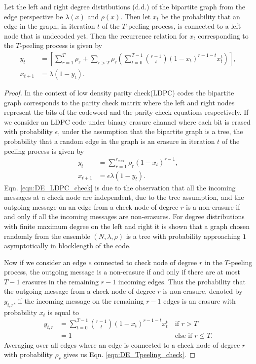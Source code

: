 \begin{lemma}
Let the left and right degree distributions (d.d.) of the bipartite graph from the edge perspective be $\lambda(x)$ and $\rho(x)$. Then let $x_{t}$ be the probability that an edge in the graph, in iteration $t$ of the $T$-peeling process, is connected to a left node that is undecoded yet. Then the recurrence relation for $x_t$ corresponding to the $T$-peeling process is given by
\begin{align}
y_{t}&=\left[\sum_{r=1}^{T} \rho_r +\sum_{r>T} \rho_r\left( \sum_{t=0}^{T-1}\binom{r-1}{t}(1-x_t)^{r-1-t} x_t^{t}\right) \right],\label{eqn:DE_Tpeeling_check}\\
x_{t+1}&=\lambda(1-y_t).\label{eqn:DE_Tpeeling_bit}
\end{align}
\label{lem:DE_Tpeeling}
\end{lemma}
\begin{proof}
In the context of low density parity check(LDPC) codes the bipartite graph corresponds to the parity check matrix where the left and right nodes represent the bits of the codeword and the parity check equations respectively. If we consider an LDPC code under binary erasure channel where each bit is erased with probability $\epsilon$, under the assumption that the bipartite graph is a tree, the probability that a random edge in the graph is an erasure in iteration $t$ of the peeling process is given by \cite{richardson2008modern}
\begin{align}
y_{t}&=\sum_{r=1}^{r_{\max}} \rho_r (1-x_t)^{r-1}, \label{eqn:DE_LDPC_check}\\
x_{t+1}&=\epsilon \lambda(1-y_t).\label{eqn:DE_LDPC_bit}
\end{align}
Eqn. \eqref{eqn:DE_LDPC_check} is due to the observation that all the incoming messages at a check node are independent, due to the tree assumption, and the outgoing message on an edge from a check node of degree $r$ is a non-erasure if and only if all the incoming messages are non-erasures. For degree distributions with finite maximum degree on the left and right it is shown that a graph chosen randomly from the ensemble $(N,\lambda,\rho)$ is a tree with probability approaching $1$ asymptotically in blocklength of the code.

Now if we consider an edge $e$ connected to check node of degree $r$ in the $T$-peeling process, the outgoing message is a non-erasure if and only if there are at most $T-1$ erasures in the remaining $r-1$ incoming edges. Thus the probability that the outgoing message from a check node of degree $r$ is non-erasure, denoted by $y_{t,r}$, if the incoming message on the remaining $r-1$ edges is an erasure with probability $x_t$ is equal to
\begin{align*}
y_{t,r}&=\sum_{t=0}^{T-1}\binom{r-1}{t}(1-x_t)^{r-1-t} x_t^{t}  ~&\text{if } r>T\\
&=1 ~&\text{else if } r\leq T.
\end{align*}
Averaging over all edges where an edge is connected to a check node of degree $r$ with probability $\rho_r$ gives us Eqn. \eqref{eqn:DE_Tpeeling_check}.
\end{proof}

